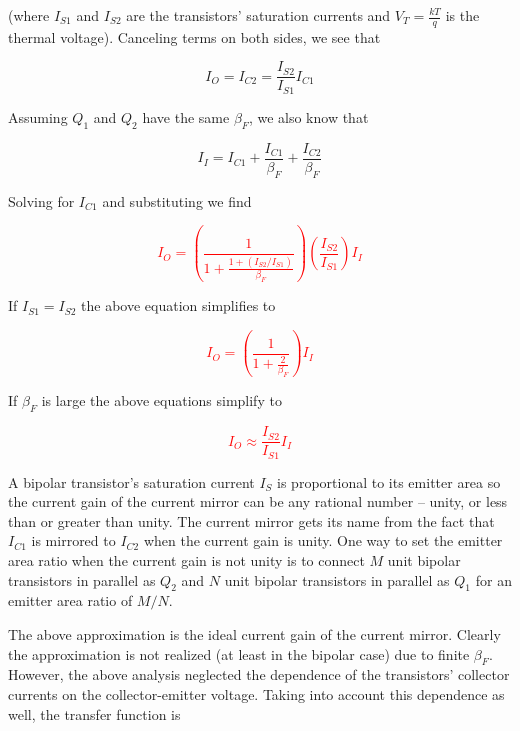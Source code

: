 (where $I_{S1}$ and $I_{S2}$ are the transistors' saturation currents and $V_{T} = \frac{kT}{q}$ is the thermal voltage).
Canceling terms on both sides, we see that

\begin{equation}
I_{O} = I_{C2} = \frac{I_{S2}}{I_{S1}}I_{C1}
\end{equation}

Assuming $Q_1$ and $Q_2$ have the same $\beta_{F}$, we also know that

\begin{equation}
I_{I} = I_{C1} + \frac{I_{C1}}{\beta_{F}} + \frac{I_{C2}}{\beta_{F}}
\end{equation}

Solving for $I_{C1}$ and substituting we find

\textcolor{red}{
\begin{equation}
I_{O} = \left(\frac{1}{1+\frac{1+(I_{S2}/I_{S1})}{\beta_{F}}}\right)\left(\frac{I_{S2}}{I_{S1}}\right)I_{I}
\label{eq:simplecurrentmirror}
\end{equation}
}

If $I_{S1} = I_{S2}$ the above equation simplifies to

\textcolor{red}{
\begin{equation}
I_{O} = \left(\frac{1}{1 + \frac{2}{\beta_{F}}}\right)I_{I}
\label{eq:simplecurrentmirror_Is_equal}
\end{equation}
}

If $\beta_{F}$ is large the above equations simplify to

\textcolor{red}{
\begin{equation}
I_{O} \approx \frac{I_{S2}}{I_{S1}}I_{I}
\label{eq:simplecurrentmirror_Beta_large}
\end{equation}
}

A bipolar transistor's saturation current $I_{S}$ is proportional to its emitter area so the current gain of the current mirror can be any rational number -- unity, or less than or greater than unity.
The current mirror gets its name from the fact that $I_{C1}$ is mirrored to $I_{C2}$ when the current gain is unity.
One way to set the emitter area ratio when the current gain is not unity is to connect $M$ unit bipolar transistors in parallel as $Q_2$ and $N$ unit bipolar transistors in parallel as $Q_1$ for an emitter area ratio of $M/N$.

The above approximation is the ideal current gain of the current mirror.
Clearly the approximation is not realized (at least in the bipolar case) due to finite $\beta_{F}$.
However, the above analysis neglected the dependence of the transistors' collector currents on the collector-emitter voltage.
Taking into account this dependence as well, the transfer function is

